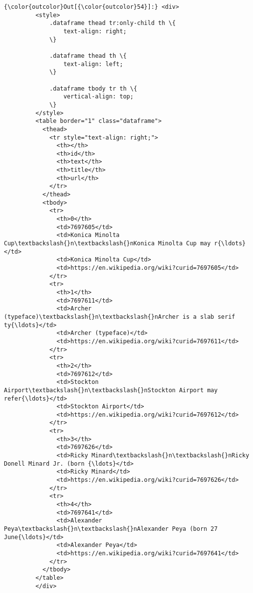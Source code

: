 \documentclass{report}
\begin{document}
\begin{Verbatim}[commandchars=\\\{\}]
{\color{outcolor}Out[{\color{outcolor}54}]:} <div>
         <style>
             .dataframe thead tr:only-child th \{
                 text-align: right;
             \}
         
             .dataframe thead th \{
                 text-align: left;
             \}
         
             .dataframe tbody tr th \{
                 vertical-align: top;
             \}
         </style>
         <table border="1" class="dataframe">
           <thead>
             <tr style="text-align: right;">
               <th></th>
               <th>id</th>
               <th>text</th>
               <th>title</th>
               <th>url</th>
             </tr>
           </thead>
           <tbody>
             <tr>
               <th>0</th>
               <td>7697605</td>
               <td>Konica Minolta Cup\textbackslash{}n\textbackslash{}nKonica Minolta Cup may r{\ldots}</td>
               <td>Konica Minolta Cup</td>
               <td>https://en.wikipedia.org/wiki?curid=7697605</td>
             </tr>
             <tr>
               <th>1</th>
               <td>7697611</td>
               <td>Archer (typeface)\textbackslash{}n\textbackslash{}nArcher is a slab serif ty{\ldots}</td>
               <td>Archer (typeface)</td>
               <td>https://en.wikipedia.org/wiki?curid=7697611</td>
             </tr>
             <tr>
               <th>2</th>
               <td>7697612</td>
               <td>Stockton Airport\textbackslash{}n\textbackslash{}nStockton Airport may refer{\ldots}</td>
               <td>Stockton Airport</td>
               <td>https://en.wikipedia.org/wiki?curid=7697612</td>
             </tr>
             <tr>
               <th>3</th>
               <td>7697626</td>
               <td>Ricky Minard\textbackslash{}n\textbackslash{}nRicky Donell Minard Jr. (born {\ldots}</td>
               <td>Ricky Minard</td>
               <td>https://en.wikipedia.org/wiki?curid=7697626</td>
             </tr>
             <tr>
               <th>4</th>
               <td>7697641</td>
               <td>Alexander Peya\textbackslash{}n\textbackslash{}nAlexander Peya (born 27 June{\ldots}</td>
               <td>Alexander Peya</td>
               <td>https://en.wikipedia.org/wiki?curid=7697641</td>
             </tr>
           </tbody>
         </table>
         </div>
\end{Verbatim}
            
\end{document}

